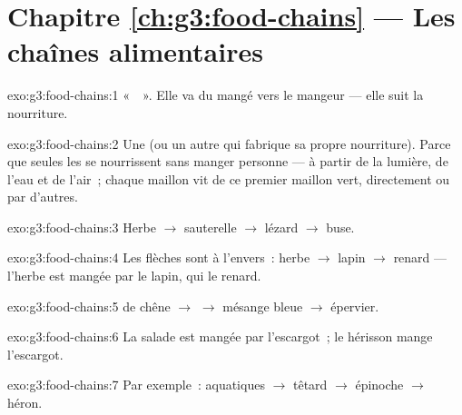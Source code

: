\section*{Chapitre \ref{ch:g3:food-chains} --- Les chaînes alimentaires}

\begin{solution}{exo:g3:food-chains:1}
«~~». Elle va du mangé vers le mangeur --- elle suit la
nourriture.
\end{solution}

\begin{solution}{exo:g3:food-chains:2}
Une  (ou un autre  qui fabrique sa propre
nourriture). Parce que seules les  se nourrissent sans manger
personne --- à partir de la lumière, de l'eau et de l'air~; chaque
maillon  vit de ce premier maillon vert, directement ou par
d'autres.
\end{solution}

\begin{solution}{exo:g3:food-chains:3}
Herbe $\rightarrow$ sauterelle $\rightarrow$ lézard $\rightarrow$
buse.
\end{solution}

\begin{solution}{exo:g3:food-chains:4}
Les flèches sont à l'envers~: herbe $\rightarrow$ lapin
$\rightarrow$ renard --- l'herbe est mangée par le lapin, qui  le renard.
\end{solution}

\begin{solution}{exo:g3:food-chains:5}
 de chêne $\rightarrow$  $\rightarrow$ mésange bleue
$\rightarrow$ épervier.
\end{solution}

\begin{solution}{exo:g3:food-chains:6}
La salade est mangée par l'escargot~; le hérisson mange l'escargot.
\end{solution}

\begin{solution}{exo:g3:food-chains:7}
Par exemple~:  aquatiques $\rightarrow$ têtard
$\rightarrow$ épinoche $\rightarrow$ héron.
\end{solution}

